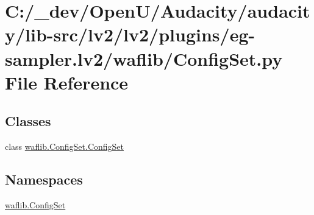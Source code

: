 \hypertarget{lv2_2plugins_2eg-sampler_8lv2_2waflib_2_config_set_8py}{}\section{C\+:/\+\_\+dev/\+Open\+U/\+Audacity/audacity/lib-\/src/lv2/lv2/plugins/eg-\/sampler.lv2/waflib/\+Config\+Set.py File Reference}
\label{lv2_2plugins_2eg-sampler_8lv2_2waflib_2_config_set_8py}
\subsection*{Classes}
\begin{DoxyCompactItemize}
\item 
class \hyperlink{classwaflib_1_1_config_set_1_1_config_set}{waflib.\+Config\+Set.\+Config\+Set}
\end{DoxyCompactItemize}
\subsection*{Namespaces}
\begin{DoxyCompactItemize}
\item 
 \hyperlink{namespacewaflib_1_1_config_set}{waflib.\+Config\+Set}
\end{DoxyCompactItemize}
